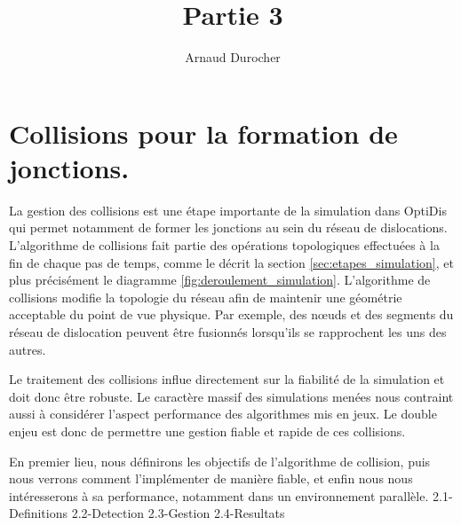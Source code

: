 \documentclass[11pt,class=article,float=false,crop=false]{standalone}
\title{ Partie 3 }
\author{Arnaud Durocher}
\begin{document}
	
\onlyifstandalone{\maketitle}
\onlyifstandalone{\tableofcontents}
\onlyifstandalone{\listoftodos}



\part{Collisions pour la formation de jonctions.}
\label{part:collision}

La gestion des collisions est une étape importante de la simulation dans OptiDis qui permet notamment de former les jonctions au sein du réseau de dislocations. L'algorithme de collisions fait partie des opérations topologiques effectuées à la fin de chaque pas de temps, comme le décrit la section \ref{sec:etapes_simulation}, et plus précisément le diagramme \ref{fig:deroulement_simulation}. L'algorithme de collisions modifie la topologie du réseau afin de maintenir une géométrie acceptable du point de vue physique. Par exemple, des nœuds et des segments du réseau de dislocation peuvent être fusionnés lorsqu'ils se rapprochent les uns des autres. 

Le traitement des collisions influe directement sur la fiabilité de la simulation et doit donc être robuste. Le caractère massif des simulations menées nous contraint aussi à considérer l'aspect performance des algorithmes mis en jeux. Le double enjeu est donc de permettre une gestion fiable et rapide de ces collisions. 

En premier lieu, nous définirons les objectifs de l'algorithme de collision, puis nous verrons comment l'implémenter de manière fiable, et enfin nous nous intéresserons à sa performance, notamment dans un environnement parallèle.
{2.1-Definitions}
{2.2-Detection}
{2.3-Gestion}
{2.4-Resultats}



\end{document}
